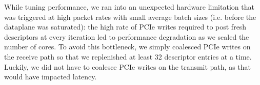 \begin{comment}
\myparagraph{Subtleties of adaptive batching:} 
Batching is commonly understood to trade off higher latency at low loads
for better throughput at high loads.  Our use of adaptive, bounded
batching actually improves on both metrics. In exploring the impact of
the batch size bound --- which impacts behavior when the workload is
CPU-bound --- we first confirmed the intuition that larger batch
sizes improve throughput, but only to a point. Fig.~\ref{fig:batch}
compares the throughput of the CPU-bound benchmark used in
Fig.~\ref{fig:short10:roundtrips}.  The experiment shows that batches
as low as $B=32$ can deliver maximal throughput for this
workload. (All experiments in \S\ref{sec:eval} were conducted with a
maximal batch size of $B=64$ packets per iteration.)  Because the
algorithm is adaptive, $B$ does not impact latency when the dataplane
is not saturated; we confirmed
this experimentally at the 99th percentile latency for
\texttt{memcache}.
\end{comment}


%


While tuning \ix performance, we ran into an unexpected hardware limitation
that was triggered at high packet rates with small average batch sizes 
(i.e. before the dataplane was saturated): 
the high rate of PCIe writes required to post fresh
descriptors at every iteration led to performance degradation as we
scaled the number of cores.  To avoid this bottleneck, we
simply coalesced PCIe writes on the receive path so that we
replenished at least 32 descriptor entries at a time.  Luckily, we did
not have to coalesce PCIe writes on the transmit path, as that would
have impacted latency.


\begin{comment}
  \myparagraph{Using interrupts as a fallback:} Some applications
  service requests that require extended intervals of compute time. We
  intend for these requests to be delegated to from elastic threads to
  background threads in order to ensure that elastic threads remain
  responsive.  However, \ix can also be modified to better tolerate
  unanticipated delays during application processing in elastic
  threads.  One option would be to use interrupts as a fallback
  mode. On the receive side, the NIC would fire an interrupt whenever
  the recieve descriptor ring is almost full. The dataplane could then
  move packets from the receive ring to a software structure, averting
  buffer underrun. On the transmit side, NIC would fire an interrupt
  whenever the transmit ring becomes empty so that it can be
  refilled. Such an interrupt would only need to be armed when there
  is additional transmit data pending. A desirable property of this
  approach is that neither interrupt would be triggered as long as
  elastic threads are sufficiently responsive, but if an elastic
  thread misbehaves, the \ix dataplane would be able to regain control
  and catch up on network processing.
\end{comment}



